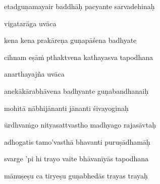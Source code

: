 etadguṇamayair baddhāḥ pacyante sarvadehinaḥ \veg\dontdisplaylinenum
{}

vigatarāga uvāca~{\dandab}\dontdisplaylinenum 

kena kena prakāreṇa guṇapāśena badhyate\thinspace{\danda} \dontdisplaylinenum
{}

cihnam eṣāṁ pthaktvena kathayasva tapodhana \veg\dontdisplaylinenum
{}

anarthayajña uvāca~{\dandab}\dontdisplaylinenum 

anekākārabhāvena badhyante guṇabandhanaiḥ\thinspace{\danda} \dontdisplaylinenum

mohitā nābhijānanti jānanti śivayoginaḥ \veg\dontdisplaylinenum
{}

ūrdhvaṁgo nityasattvastho madhyago rajasāvtaḥ\thinspace{\dandab} \dontdisplaylinenum
{}

adhogatis tamo'vasthā bhavanti puruṣādhamāḥ \veg\dontdisplaylinenum
{}

svarge 'pi hi trayo vaite bhāvanīyās tapodhana\thinspace{\dandab} \dontdisplaylinenum

mānuṣeṣu ca tiryeṣu guṇabhedās trayas trayaḥ \veg\dontdisplaylinenum
{}



